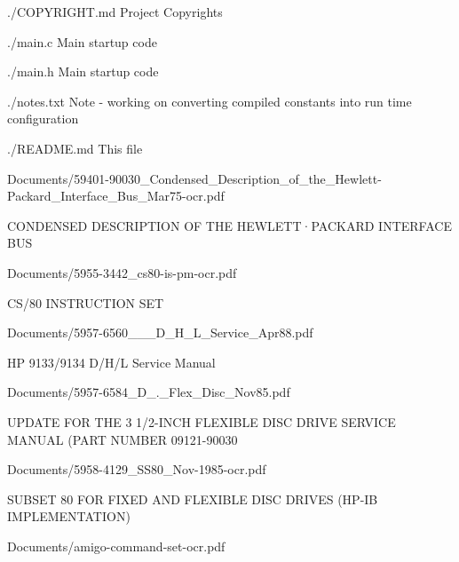 \begin{DoxyItemize}
\item ./\+C\+O\+P\+Y\+R\+I\+G\+HT.md Project Copyrights
\item ./main.c Main startup code
\item ./main.h Main startup code
\item ./notes.txt Note -\/ working on converting compiled constants into run time configuration
\item ./\+R\+E\+A\+D\+ME.md This file
\item Documents/59401-\/90030\+\_\+\+Condensed\+\_\+\+Description\+\_\+of\+\_\+the\+\_\+\+Hewlett-\/\+Packard\+\_\+\+Interface\+\_\+\+Bus\+\_\+\+Mar75-\/ocr.\+pdf
\begin{DoxyItemize}
\item C\+O\+N\+D\+E\+N\+S\+ED D\+E\+S\+C\+R\+I\+P\+T\+I\+ON OF T\+HE H\+E\+W\+L\+E\+T\+T·\+P\+A\+C\+K\+A\+RD I\+N\+T\+E\+R\+F\+A\+CE B\+US
\end{DoxyItemize}
\item Documents/5955-\/3442\+\_\+cs80-\/is-\/pm-\/ocr.\+pdf
\begin{DoxyItemize}
\item C\+S/80 I\+N\+S\+T\+R\+U\+C\+T\+I\+ON S\+ET
\end{DoxyItemize}
\item Documents/5957-\/6560\+\_\+\_\+\_\+\+D\+\_\+\+H\+\_\+\+L\+\_\+\+Service\+\_\+\+Apr88.\+pdf
\begin{DoxyItemize}
\item HP 9133/9134 D/\+H/L Service Manual
\end{DoxyItemize}
\item Documents/5957-\/6584\+\_\+D\+\_.\+\_\+\+Flex\+\_\+\+Disc\+\_\+\+Nov85.\+pdf
\begin{DoxyItemize}
\item U\+P\+D\+A\+TE F\+OR T\+HE 3 1/2-\/\+I\+N\+CH F\+L\+E\+X\+I\+B\+LE D\+I\+SC D\+R\+I\+VE S\+E\+R\+V\+I\+CE M\+A\+N\+U\+AL (P\+A\+RT N\+U\+M\+B\+ER 09121-\/90030
\end{DoxyItemize}
\item Documents/5958-\/4129\+\_\+\+S\+S80\+\_\+\+Nov-\/1985-\/ocr.\+pdf
\begin{DoxyItemize}
\item S\+U\+B\+S\+ET 80 F\+OR F\+I\+X\+ED A\+ND F\+L\+E\+X\+I\+B\+LE D\+I\+SC D\+R\+I\+V\+ES (H\+P-\/\+IB I\+M\+P\+L\+E\+M\+E\+N\+T\+A\+T\+I\+ON)
\end{DoxyItemize}
\item Documents/amigo-\/command-\/set-\/ocr.\+pdf

\end{DoxyItemize}
